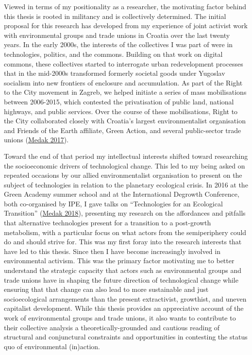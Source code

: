 \documentclass[a4paper, nobind]{templates/ociamthesis}
\begin{document}
Viewed in terms of my positionality as a researcher, the motivating factor behind this thesis is rooted in militancy and is collectively determined. The initial proposal for this research has developed from my experience of joint activist work with environmental groups and trade unions in Croatia over the last twenty years. In the early 2000s, the interests of the collectives I was part of were in technologies, politics, and the commons. Building on that work on digital commons, these collectives started to interrogate urban redevelopment processes that in the mid-2000s transformed formerly societal goods under Yugoslav socialism into new frontiers of enclosure and accumulation. As part of the Right to the City movement in Zagreb, we helped initiate a series of mass mobilisations between 2006-2015, which contested the privatisation of public land, national highways, and public services. Over the course of these mobilisations, Right to the City collaborated closely with Croatia's largest environmentalist organisation and Friends of the Earth affiliate, Green Action, and several public-sector trade unions (\protect\hyperlink{ref-MedakIndependentCulturalWork2017}{Medak 2017}).

Toward the end of that period my intellectual interests shifted toward researching the socioeconomic drivers of technological change. This led to my being asked on repeated occasions by our allied environmentalist organisation to present on the subject of technologies in relation to the planetary ecological crisis. In 2016 at the Green Academy summer school and at the International Degrowth Conference, both co-organised by IPE, I gave talks on ``Technologies for an Ecological Transition'' (\protect\hyperlink{ref-medak_technologies_2018}{Medak 2018}), presenting my research on the affordances and pitfalls that alternative technologies present for a transition to a post-growth metabolism, with a particular focus on what actors from the semiperiphery could do and should strive for. This was my first foray into the research interests that have led to this thesis. Since then I have become increasingly involved in environmental activism. This was the primary factor motivating me to better understand the strategic capacity that actors such as environmental groups and trade unions have in shaping the future direction of technological change while ensuring that that change can also lead to more sustainable and just socioecological arrangements than the present extractivist, growthist, and uneven capitalist development. While this thesis provides an appreciative account of the work of environmental groups and trade unions, it also wants to contribute to their collective analysis a theoretically-grounded and cautious reading of structural and conjunctural constraints and opportunities in contesting the status quo of environmental (in)action.
\end{document}
